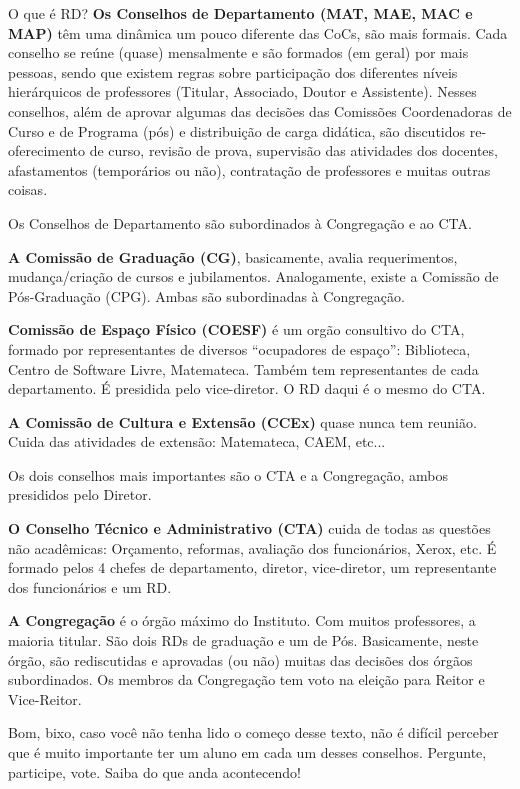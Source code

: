\begin{secao}{O que é RD?}
{\bf Os Conselhos de Departamento (MAT, MAE, MAC e MAP)} têm uma dinâmica um
pouco diferente das CoCs, são mais formais. Cada conselho se reúne (quase)
mensalmente e são formados (em geral) por mais pessoas, sendo que existem
regras sobre participação dos diferentes níveis hierárquicos de
professores (Titular, Associado, Doutor e Assistente). Nesses conselhos, além
de aprovar algumas das decisões das Comissões Coordenadoras de Curso e de
Programa (pós) e distribuição de carga didática, são discutidos re-oferecimento
de curso, revisão de prova, supervisão das atividades dos docentes,
afastamentos (temporários ou não), contratação de professores e muitas outras
coisas.

Os Conselhos de Departamento são subordinados à Congregação e ao CTA.

{\bf A Comissão de Graduação (CG)}, basicamente, avalia requerimentos,
mudança/criação de cursos e jubilamentos. Analogamente, existe a Comissão de
Pós-Graduação (CPG). Ambas são subordinadas à Congregação.

{\bf Comissão de Espaço Físico (COESF)} é um orgão consultivo do CTA, formado
por representantes de diversos ``ocupadores de espaço'': Biblioteca, Centro de
Software Livre, Matemateca. Também tem representantes de cada departamento. É
presidida pelo vice-diretor. O RD daqui é o mesmo do CTA.

{\bf A Comissão de Cultura e Extensão (CCEx)} quase nunca tem reunião. Cuida
das atividades de extensão: Matemateca, CAEM, etc...

Os dois conselhos mais importantes são o CTA e a Congregação, ambos presididos
pelo Diretor.

{\bf O Conselho Técnico e Administrativo (CTA)} cuida de todas as questões não
acadêmicas: Orçamento, reformas, avaliação dos funcionários, Xerox, etc. É 
formado pelos 4 chefes de departamento, diretor, vice-diretor, um
representante dos funcionários e um RD.

{\bf A Congregação} é o órgão máximo do Instituto. Com muitos professores, a
maioria titular. São dois RDs de graduação e um de Pós. Basicamente,
neste órgão, são rediscutidas e aprovadas (ou não) muitas das decisões
dos órgãos subordinados. Os membros da Congregação tem voto na eleição para
Reitor e Vice-Reitor.

Bom, bixo, caso você não tenha lido o começo desse texto, não é difícil
perceber que é muito importante ter um aluno em cada um desses conselhos.
Pergunte, participe, vote. Saiba do que anda acontecendo!


\end{secao}
